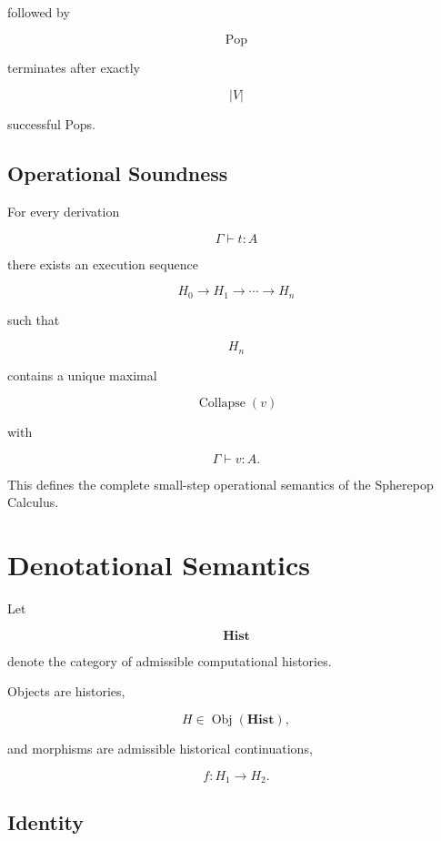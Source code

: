 \documentclass[12pt,oneside]{article}
\theoremstyle{definition}
\theoremstyle{remark}
\begin{document}
followed by

\[
\operatorname{Pop}
\]

terminates after exactly

\[
|V|
\]

successful Pops.

\subsection*{Operational Soundness}

For every derivation

\[
\Gamma
\vdash
t:A
\]

there exists an execution sequence

\[
H_0
\longrightarrow
H_1
\longrightarrow
\cdots
\longrightarrow
H_n
\]

such that

\[
H_n
\]

contains a unique maximal

\[
\operatorname{Collapse}(v)
\]

with

\[
\Gamma
\vdash
v:A.
\]

This defines the complete small-step operational semantics of the Spherepop
Calculus.

\section{Denotational Semantics}

Let

\[
\mathbf{Hist}
\]

denote the category of admissible computational histories.

Objects are histories,

\[
H
\in
\operatorname{Obj}(\mathbf{Hist}),
\]

and morphisms are admissible historical continuations,

\[
f:H_1\rightarrow H_2.
\]

\subsection*{Identity}
\end{document}
